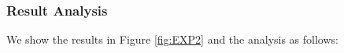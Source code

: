 \documentclass[10pt,journal,compsoc]{IEEEtran}
\begin{document}
	
	
	

\subsubsection{Result Analysis}
 
We show the results in Figure \ref{fig:EXP2} and the analysis as follows:
\end{document}
